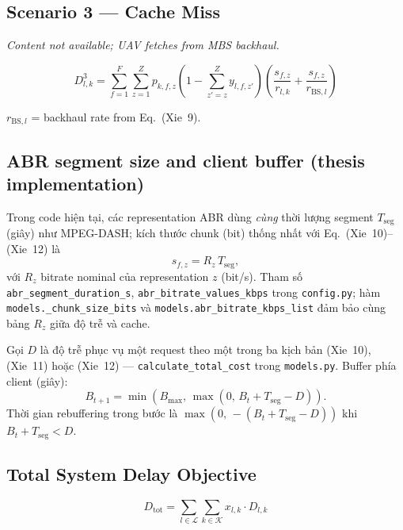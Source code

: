 \documentclass[11pt,a4paper]{article}
\begin{document}
\subsection{Scenario 3 — Cache Miss}
\emph{Content not available; UAV fetches from MBS backhaul.}

\begin{equation}
  D_{l,k}^3 = \sum_{f=1}^{F}\sum_{z=1}^{Z}
    p_{k,f,z}
    \left(1 - \sum_{z'=z}^{Z} y_{l,f,z'}\right)
    \left(\frac{s_{f,z}}{r_{l,k}} + \frac{s_{f,z}}{r_{\mathrm{BS},l}}\right)
  \tag{Xie~12}
\end{equation}

\noindent $r_{\mathrm{BS},l}$ = backhaul rate from Eq.~(Xie~9).

\subsection{ABR segment size and client buffer (thesis implementation)}
\label{sec:abr-impl}

Trong code hiện tại, các representation ABR dùng \emph{cùng} thời lượng segment
$T_{\mathrm{seg}}$ (giây) như MPEG-DASH; kích thước chunk (bit) thống nhất với
Eq.~(Xie~10)--(Xie~12) là
\begin{equation}
  s_{f,z} = R_z\, T_{\mathrm{seg}},
  \tag{impl-ABR-s}
\end{equation}
với $R_z$ bitrate nominal của representation $z$ (bit/s).
Tham số \texttt{abr\_segment\_duration\_s}, \texttt{abr\_bitrate\_values\_kbps} trong
\texttt{config.py}; hàm \texttt{models.\_chunk\_size\_bits} và
\texttt{models.abr\_bitrate\_kbps\_list} đảm bảo cùng bảng $R_z$ giữa độ trễ và cache.

Gọi $D$ là độ trễ phục vụ một request theo một trong ba kịch bản (Xie~10), (Xie~11) hoặc (Xie~12)
--- \texttt{calculate\_total\_cost} trong \texttt{models.py}. Buffer phía client (giây):
\begin{equation}
  B_{t+1} = \min\!\left(B_{\max},\, \max\!\left(0,\, B_t + T_{\mathrm{seg}} - D\right)\right).
  \tag{impl-buffer}
\end{equation}
Thời gian rebuffering trong bước là $\max(0,\, -(B_t + T_{\mathrm{seg}} - D))$ khi $B_t + T_{\mathrm{seg}} < D$.

\subsection{Total System Delay Objective}

\begin{equation}
  D_{\mathrm{tot}} = \sum_{l \in \mathcal{L}} \sum_{k \in \mathcal{K}}
    x_{l,k} \cdot D_{l,k}
  \tag{Xie~14}
\end{equation}
\end{document}
